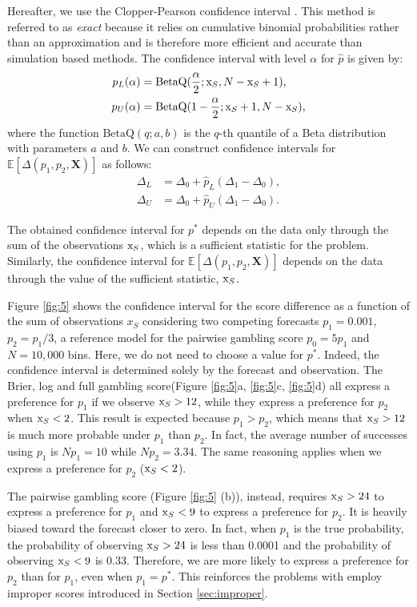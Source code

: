 \documentclass[referee,sn-basic]{sn-jnl}
\theoremstyle{thmstyleone}%
\theoremstyle{thmstyletwo}%
\theoremstyle{thmstylethree}%
\begin{document}
Hereafter, we use the Clopper-Pearson confidence interval \citep{clopper1934use}. This method is referred to as \emph{exact} because it relies on cumulative binomial probabilities rather than an approximation and is therefore more efficient and accurate than simulation based methods. The confidence interval with level $\alpha$ for $\hat p$ is given by:
\begin{align*}
p_L(\alpha) &= \text{BetaQ}(\frac{\alpha}{2}; \text x_S, N - \text x_S + 1 ), \\
p_U(\alpha) &= \text{BetaQ}(1 - \frac{\alpha}{2}; \text x_S + 1, N - \text x_S),
\end{align*}
where the function $\text{BetaQ}(q; a , b)$ is the $q$-th quantile of a Beta distribution with parameters $a$ and $b$. We can construct confidence intervals for $\mathbb E[\Delta(p_1, p_2, \mathbf X)]$ as follows:
\begin{align*}
\Delta_L &= \Delta_0 + \hat p_L(\Delta_1 - \Delta_0), \\
\Delta_U &= \Delta_0 + \hat p_U(\Delta_1 - \Delta_0) .
\end{align*}

The obtained confidence interval for $p^*$ depends on the data only through the sum of the observations $\text x_S$, which is a sufficient statistic for the problem. Similarly, the confidence interval for $\mathbb E[\Delta(p_1,p_2,\mathbf X)]$ depends on the data through the value of the sufficient statistic, $\text x_S$.  

Figure \ref{fig:5} shows the confidence interval for the score difference as a function of the sum of observations $x_S$ considering two competing forecasts $p_1 = 0.001$, $p_2 = p_1/3$, a reference model for the pairwise gambling score $p_0 = 5p_1$ and $N = 10,000$ bins. Here, we do not need to choose a value for $p^*$. Indeed, the confidence interval is determined solely by the forecast and observation. The Brier, log and full gambling score(Figure \ref{fig:5}a, \ref{fig:5}c, \ref{fig:5}d) all express a preference for $p_1$ if we observe $\text x_S > 12$, while they express a preference for $p_2$ when $\text x_S < 2$. This result is expected because $p_1 > p_2$, which means that $\text x_S > 12$ is much more probable under $p_1$ than $p_2$. In fact, the average number of successes using $p_1$ is $Np_1 = 10$ while $Np_2 = 3.34$. The same reasoning applies when we express a preference for $p_2$ ($\text x_S < 2$). 

The pairwise gambling score (Figure \ref{fig:5} (b)), instead, requires $\text x_S > 24$ to express a preference for $p_1$ and $\text x_S < 9$ to express a preference for $p_2$. It is heavily biased toward the forecast closer to zero. In fact, when $p_1$ is the true probability, the probability of observing $\text x_S > 24$ is less than 0.0001 and the probability of observing $\text x_S < 9$ is 0.33. Therefore, we are more likely to express a preference for $p_2$ than for $p_1$, even when $p_1 = p^*$. This reinforces the problems with employ improper scores introduced in Section \ref{sec:improper}. 
\end{document}
